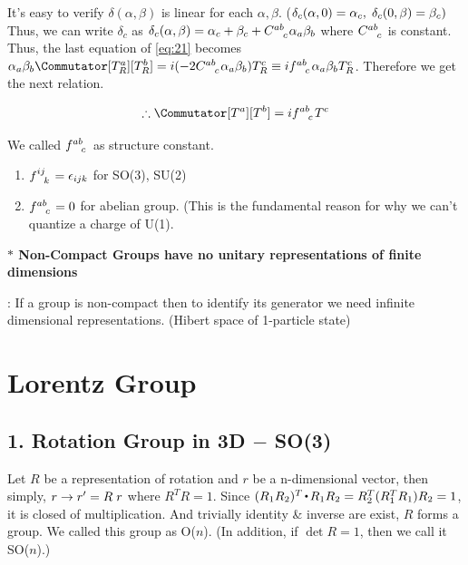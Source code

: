 \documentclass[11pt,letterpaper]{article}
\begin{document}
It's easy to verify $\delta(\alpha,\beta)$ is linear for each $\alpha, \beta$. ($\delta_c(\alpha,0) = \alpha_c,\hspace{0.1cm} \delta_c(0,\beta)=\beta_c)$
Thus, we can write $\delta_c$ as $\delta_c(\alpha,\beta) = \alpha_c + \beta_c + \tensor{C}{^a^b_c}\alpha_a\beta_b$ where $\tensor{C}{^{ab}_c}$
is constant. Thus, the last equation of \eqref{eq:21} becomes $\alpha_a\beta_b\Commutator[T^a_R][T^b_R] = i(-2\tensor{C}{^a^b_c}
\alpha_a\beta_b)T^c_R \equiv i\tensor{f}{^{ab}_c}\alpha_a\beta_bT^c_R$. Therefore we get the next relation.

\begin{equation}
 \therefore \Commutator[T^a][T^b] = i\tensor{f}{^a^b_c}T^c
\end{equation}

We called $\tensor{f}{^{ab}_c}$ as structure constant.

\vs

\begin{example}
\normalfont
 \begin{enumerate}
  \item $\tensor{f}{^{ij}_k}=\epsilon_{ijk}$ for SO(3), SU(2)
  \item $\tensor{f}{^{ab}_c}=0$ for abelian group. (This is the fundamental reason for why we can't quantize a charge of U(1).
 \end{enumerate}
\end{example}

\VS

\textbf{$*$ Non-Compact Groups have no unitary representations of finite dimensions}

: If a group is non-compact then to identify its generator we need infinite dimensional representations. (Hibert space of 1-particle state)

\newpage

\section*{Lorentz Group}

\subsection*{1. Rotation Group in 3D $-$ SO(3)}

Let $R$ be a representation of rotation and $r$ be a n-dimensional vector, then simply, 
$r \rightarrow r'=R\hspace{0.1cm} r$ where $R^TR=1$. Since $(R_1R_2)^T \ld R_1R_2 = R_2^T(R_1^TR_1)R_2 = 1$, it is closed of multiplication. And trivially identity \& inverse
are exist, $R$ forms a group. We called this group as O($n$). (In addition, if $\det R = 1$, then we call it SO($n$).)
\end{document}
